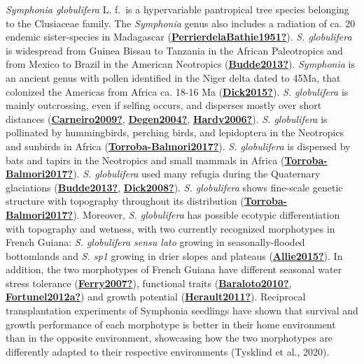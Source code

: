 \documentclass[12pt,twoside,a4paper, a]{article}
\begin{document}
\emph{Symphonia globulifera} L. f.~is a hypervariable pantropical tree species belonging to the Clusiaceae family.
The \emph{Symphonia} genus also includes a radiation of ca. 20 endemic sister-species in Madagascar (\protect\hyperlink{ref-PerrierdelaBathie1951}{\textbf{PerrierdelaBathie1951?}}).
\emph{S. globulifera} is widespread from Guinea Bissau to Tanzania in the African Paleotropics and from Mexico to Brazil in the American Neotropics (\protect\hyperlink{ref-Budde2013}{\textbf{Budde2013?}}).
\emph{Symphonia} is an ancient genus with pollen identified in the Niger delta dated to 45Ma, that colonized the Americas from Africa ca. 18-16 Ma (\protect\hyperlink{ref-Dick2015}{\textbf{Dick2015?}}).
\emph{S. globulifera} is mainly outcrossing, even if selfing occurs, and disperses mostly over short distances (\protect\hyperlink{ref-Carneiro2009}{\textbf{Carneiro2009?}}, \protect\hyperlink{ref-Degen2004}{\textbf{Degen2004?}}, \protect\hyperlink{ref-Hardy2006}{\textbf{Hardy2006?}}).
\emph{S. globulifera} is pollinated by hummingbirds, perching birds, and lepidoptera in the Neotropics and sunbirds in Africa (\protect\hyperlink{ref-Torroba-Balmori2017}{\textbf{Torroba-Balmori2017?}}).
\emph{S. globulifera} is dispersed by bats and tapirs in the Neotropics and small mammals in Africa (\protect\hyperlink{ref-Torroba-Balmori2017}{\textbf{Torroba-Balmori2017?}}).
\emph{S. globulifera} used many refugia during the Quaternary glaciations (\protect\hyperlink{ref-Budde2013}{\textbf{Budde2013?}}, \protect\hyperlink{ref-Dick2008}{\textbf{Dick2008?}}).
\emph{S. globulifera} shows fine-scale genetic structure with topography throughout its distribution (\protect\hyperlink{ref-Torroba-Balmori2017}{\textbf{Torroba-Balmori2017?}}).
Moreover, \emph{S. globulifera} has possible ecotypic differentiation with topography and wetness, with two currently recognized morphotypes in French Guiana: \emph{S. globulifera sensu lato} growing in seasonally-flooded bottomlands and \emph{S. sp1} growing in drier slopes and plateaus (\protect\hyperlink{ref-Allie2015}{\textbf{Allie2015?}}).
In addition, the two morphotypes of French Guiana have different seasonal water stress tolerance (\protect\hyperlink{ref-Ferry2007}{\textbf{Ferry2007?}}), functional traits (\protect\hyperlink{ref-Baraloto2010}{\textbf{Baraloto2010?}}, \protect\hyperlink{ref-Fortunel2012a}{\textbf{Fortunel2012a?}}) and growth potential (\protect\hyperlink{ref-Herault2011}{\textbf{Herault2011?}}).
Reciprocal transplantation experiments of Symphonia seedlings have shown that survival and growth performance of each morphotype is better in their home environment than in the opposite environment, showcasing how the two morphotypes are differently adapted to their respective environments (Tysklind et al., 2020).
\end{document}
